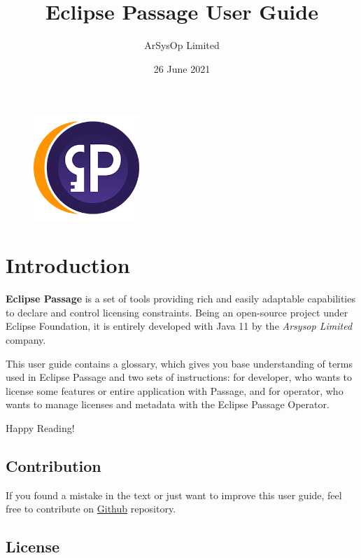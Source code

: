 \documentclass[12pt]{article}
\title{Eclipse Passage User Guide}
\author{ArSysOp Limited}
\date{26 June 2021}
\begin{document}
\maketitle

\begin{figure}[h]
    \includegraphics[width=4cm]{passage}
    \centering
\end{figure}

\newpage

\tableofcontents

\newpage

\section{Introduction}

\textbf{Eclipse Passage} is a set of tools providing rich and easily adaptable capabilities to declare and control licensing constraints.
Being an open-source project under Eclipse Foundation, it is entirely developed with Java 11 by the \textit{Arsysop Limited} company.

This user guide contains a glossary, which gives you base understanding of terms used in Eclipse Passage and two sets of instructions: for developer, who
wants to license some features or entire application with Passage, and for operator, who wants to manage licenses and metadata with the Eclipse Passage Operator.

Happy Reading!

\subsection{Contribution}

If you found a mistake in the text or just want to improve this user guide, feel free to contribute on \href{https://github.com/eclipse-passage/passage-docs}{Github} repository.

\subsection{License}
\end{document}
